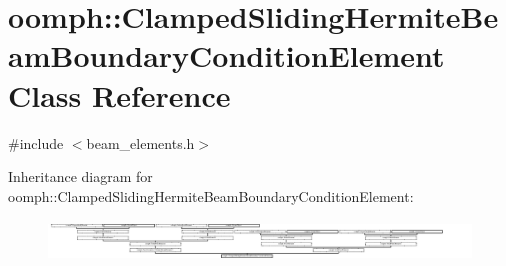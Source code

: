 \hypertarget{classoomph_1_1ClampedSlidingHermiteBeamBoundaryConditionElement}{}\section{oomph\+:\+:Clamped\+Sliding\+Hermite\+Beam\+Boundary\+Condition\+Element Class Reference}
\label{classoomph_1_1ClampedSlidingHermiteBeamBoundaryConditionElement}


{\ttfamily \#include $<$beam\+\_\+elements.\+h$>$}

Inheritance diagram for oomph\+:\+:Clamped\+Sliding\+Hermite\+Beam\+Boundary\+Condition\+Element\+:\begin{figure}[H]
\begin{center}
\leavevmode
\includegraphics[height=1.117021cm]{classoomph_1_1ClampedSlidingHermiteBeamBoundaryConditionElement}
\end{center}
\end{figure}
